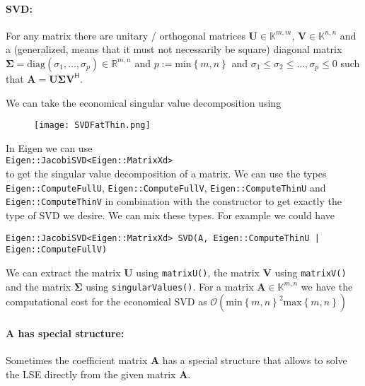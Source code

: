 \documentclass{article}
\begin{document}
\paragraph{SVD:} For any matrix there are unitary / orthogonal matrices $\mathbf{U}\in \mathbb{K}^{m,m}$, $\mathbf{V}\in \mathbb{K}^{n,n}$ and a (generalized, means that it must not necessarily be square) diagonal matrix $\mathbf{\Sigma} = \text{diag}\left(\sigma_{1},\dots, \sigma_{p}\right) \in \mathbb{R}^{m,n}$ and $p:=\text{min}\left\{m,n\right\}$ and $\sigma_{1} \leq \sigma_{2} \leq \dots, \sigma_{p} \leq 0$ such that $\mathbf{A} = \mathbf{U}\mathbf{\Sigma}\mathbf{V}^{\mathsf{H}}$. 

\pagebreak

\noindent We can take the economical singular value decomposition using

\begin{figure}[!hbt]
    \centering
\texttt{[image: SVDFatThin.png]}
\end{figure}

\noindent In Eigen we can use \\[2mm]
\verb|Eigen::JacobiSVD<Eigen::MatrixXd>| \\[1mm]
to get the singular value decomposition of a matrix. We can use the types \verb|Eigen::ComputeFullU|, \verb|Eigen::ComputeFullV|, \verb|Eigen::ComputeThinU| and  \\ \verb|Eigen::ComputeThinV| in combination with the constructor to get exactly the type of SVD we desire. We can mix these types. For example we could have \\[2mm]
\begin{verbatim}
Eigen::JacobiSVD<Eigen::MatrixXd> SVD(A, Eigen::ComputeThinU | Eigen::ComputeFullV)
\end{verbatim}
We can extract the matrix $\mathbf{U}$ using \verb|matrixU()|, the matrix $\mathbf{V}$ using \verb|matrixV()| and the matrix $\mathbf{\Sigma}$ using \verb|singularValues()|. For a matrix $\mathbf{A}\in \mathbb{K}^{m,n}$ we have the computational cost for the economical SVD as $\mathcal{O}\left(\text{min}\left\{m,n\right\}^{2}\text{max}\left\{m,n\right\}\right)$

\paragraph{$\mathbf{A}$ has special structure:} Sometimes the coefficient matrix $\mathbf{A}$ has a special structure that allows to solve the LSE directly from the given matrix $\mathbf{A}$.
\end{document}
